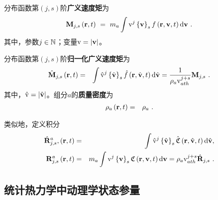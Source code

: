 \begin{definition} \label{定义-广义速度矩}
  分布函数第$(j,s)$阶\textbf{广义速度矩}为
  \begin{equation}
      \mathbf{M}_{j,s} \left(\mathbf{r},t \right) \ = \ m_a \int \mathrm{v}^j \left \{\mathbf{v} \right \}_s f \left(\mathbf{r},\mathbf{v},t \right) \mathrm{d} \mathbf{v} ~. \label{Mjs}
  \end{equation}
  其中，参数$j \in \mathbb{N} $；变量$\mathrm{v} = |\mathbf{v}|$。
\end{definition}
\noindent
\begin{definition} \label{定义-归一化广义速度矩}
  分布函数第$(j,s)$阶\textbf{归一化广义速度矩}为
  \begin{eqnarray}
      \hat{\mathbf{M}}_{j,s} \left(\mathbf{r},t \right) &=& \int \hat{\mathrm{v}}^j \left \{\hat{\mathbf{v}} \right \}_s \hat{f} \left(\mathbf{r},\hat{\mathbf{v}},t \right) \mathrm{d} \hat{\mathbf{v}}  = \frac{1}{\rho_a \mathrm{v}_{ath}^{j+s}}\mathbf{M}_{j,s} ~. \label{Mhjs}
  \end{eqnarray}
  其中，$\hat{\mathrm{v}} = |\hat{\mathbf{v}}|$。组分$a$的\textbf{质量密度}为
  \begin{eqnarray}
      \rho_a \left(\mathbf{r},t \right) &=& \rho_a ~. \label{rhoa} 
  \end{eqnarray}
\end{definition}
\noindent
  类似地，定义积分
  \begin{eqnarray}
      \hat{\mathbf{R}}_{j,s}^a, \left(\mathbf{r},t \right) &=& \int \hat{\mathrm{v}}^j \left \{\hat{\mathbf{v}} \right \}_s \hat{\mathfrak{C}} \left(\mathbf{r},\hat{\mathbf{v}},t \right) \mathrm{d} \hat{\mathbf{v}}, \label{Rhjs} \\
      {\mathbf{R}}_{j,s}^a \left(\mathbf{r},t \right) &=& m_a \int \mathrm{v}^j \left \{\mathbf{v} \right \}_s \mathfrak{C} \left(\mathbf{r},\mathbf{v},t \right) \mathrm{d} \mathbf{v}  = \rho_a \mathrm{v}_{ath}^{j+s} \hat{\mathbf{R}}_{j,s} ~. \label{Rjs}
  \end{eqnarray}
  
\subsection{统计热力学中动理学状态参量} 
\label{统计热力学中动理学状态参量}

